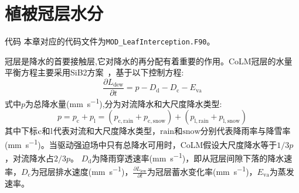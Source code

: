 
\chapter{植被冠层水分}\label{植被冠层截留}

\begin{mymdframed}{代码}
  本章对应的代码文件为\texttt{MOD\_LeafInterception.F90}。
\end{mymdframed}

冠层是降水的首要接触层,它对降水的再分配有着重要的作用。CoLM冠层的水量平衡方程主要采用SiB2方案~\citep{sellers1996revised}，基于以下控制方程:
\begin{equation}\label{eq:冠层水量控制方程}
  \frac{\partial L_{\mathrm{dew}}}{\partial t} = p-D_{\mathrm{d}}-D_{\mathrm{c}}-E_{\mathrm{va}}
\end{equation}
式中$p$为总降水量(\unit{mm.s^{-1}}),分为对流降水和大尺度降水类型:
\begin{equation}\label{eq:降水类型}
  p=p_{\mathrm{c}}+p_{\mathrm{l}}=\left(p_{\mathrm{c,rain}}+p_{\mathrm{c,snow}}\right)+\left(p_{\mathrm{l,rain}}+p_{\mathrm{l,snow}}\right)
\end{equation}
其中下标$\rm c$和$\rm l$代表对流和大尺度降水类型，$\text{rain}$和$\text{snow}$分别代表降雨率与降雪率(\unit{mm.s^{-1}})。当驱动强迫场中只有总降水可用时，CoLM假设大尺度降水等于$1/3p$，对流降水占$2/3p$。
$D_{\mathrm {d}} $为降雨穿透速率(\unit{mm.s^{-1}})，即从冠层间隙下落的降水速率，$D_{\mathrm {c}} $为冠层排水速度(\unit{mm.s^{-1}})，$\frac{\partial L_{\mathrm{lew}}}{\partial t}$为冠层蓄水变化率(\unit{mm.s^{-1}})，$E_{\mathrm{va}}$为蒸发速率。

